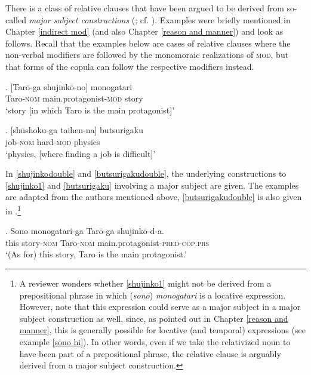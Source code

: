 \documentclass [output=book,colorlinks,citecolor=brown]{langscibook}
\begin{document}
There is a class of relative clauses that have been argued to be derived from so-called \textit{major subject constructions} (\citealt[ch. 9]{kuroda:1992:japanese}; cf. \citealt{kuno:1973:structure, heycock:1993:syntactic, whitman:2013:prehead, miyamoto:2017:RC}). Examples were briefly mentioned in Chapter \ref{indirect mod} (and also Chapter \ref{reason and manner}) and look as follows. Recall that the examples below are cases of relative clauses where the non-verbal modifiers are followed by the monomoraic realizations of \textsc{mod}, but that forms of the copula can follow the respective modifiers instead. %

\exg. [Tarō-ga shujinkō-no] monogatari\\
Taro-\textsc{nom} main.protagonist-\textsc{mod} story\\
`story [in which Taro is the main protagonist]’ \null \hfill \citep[66]{watanabe:2010:notes} \label{shujinko1}

\exg. [shūshoku-ga taihen-na] butsurigaku\\
job-\textsc{nom} hard-\textsc{mod} physics\\
`physics, [where finding a job is difficult]’ \null \hfill \citep[255]{kuno:1973:structure} \label{butsurigaku}

In \ref{shujinkodouble} and \ref{butsurigakudouble}, the underlying constructions to \ref{shujinko1} and \ref{butsurigaku} involving a major subject are given. The examples are adapted from the authors mentioned above, \ref{butsurigakudouble} is also given in \citet[179]{heycock:1993:syntactic}.\footnote{A reviewer wonders whether \ref{shujinko1} might not be derived from a prepositional phrase in which (\textit{sono}) \textit{monogatari} is a locative expression. However, note that this expression could serve as a major subject in a major subject construction as well, since, as pointed out in Chapter \ref{reason and manner}, this is generally possible for locative (and temporal) expressions (see example \ref{sono hi}). In other words, even if we take the relativized noun to have been part of a prepositional phrase, the relative clause is arguably derived from a major subject construction.}


\exg. Sono monogatari-ga Tarō-ga shujinkō-d-a.\\
this story-\textsc{nom} Taro-\textsc{nom} main.protagonist-\textsc{pred-cop.prs}\\
`(As for) this story, Taro is the main protagonist.’ \label{shujinkodouble}
\end{document}
